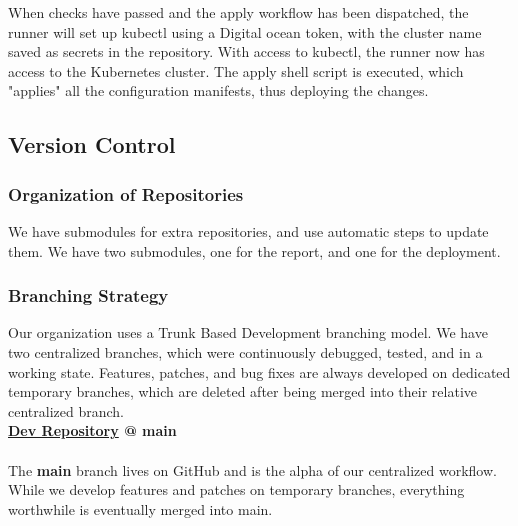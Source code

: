 When checks have passed and the apply workflow has been dispatched, the runner will set up kubectl using a Digital ocean token, with the cluster name saved as secrets in the repository. With access to kubectl, the runner now has access to the Kubernetes cluster. The apply shell script is executed, which "applies" all the configuration manifests, thus deploying the changes.


\subsection{Version Control}
\label{subsec:vs}
\subsubsection{Organization of Repositories}
We have submodules for extra repositories, and use automatic steps to update them. We have two submodules, one for the report, and one for the deployment.
\subsubsection{Branching Strategy}


Our organization uses a Trunk Based Development branching model. We have two centralized branches, which were continuously debugged, tested, and in a working state. Features, patches, and bug fixes are always developed on dedicated temporary branches, which are deleted after being merged into their relative centralized branch. \\

\textbf{\hyperref[app:devRepo]{Dev Repository} @ main} \\\\
The \textbf{main} branch lives on GitHub and is the alpha of our centralized workflow. While we develop features and patches on temporary branches, everything worthwhile is eventually merged into main. \\

